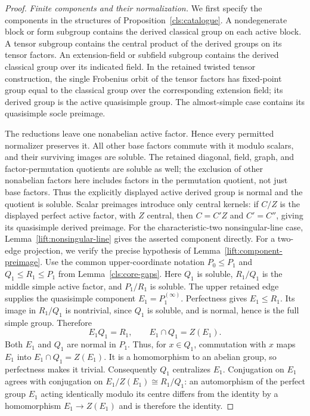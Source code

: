 \begin{proof}
\emph{Finite components and their normalization.}
We first specify the components in the structures of
Proposition~\ref{cls:catalogue}.  A nondegenerate block or form subgroup
contains the derived classical group on each active block.  A tensor
subgroup contains the central product of the derived groups on its
tensor factors.  An extension-field or subfield subgroup contains the
derived classical group over its indicated field.  In the retained
twisted tensor construction, the single Frobenius orbit of the tensor
factors has fixed-point group equal to the classical group over the
corresponding extension field; its derived group is the active
quasisimple group.  The almost-simple case contains its quasisimple
socle preimage.

The reductions leave one nonabelian active factor.  Hence every
permitted normalizer preserves it.  All other base factors commute
with it modulo scalars, and their surviving images are soluble.
The retained diagonal, field, graph, and factor-permutation quotients
are soluble as well; the exclusion of other nonabelian factors here
includes factors in the permutation quotient, not just base factors.
Thus the explicitly displayed active derived group is normal and the
quotient is soluble.  Scalar preimages introduce only central kernels:
if $C/Z$ is the displayed perfect active factor, with $Z$ central,
then $C=C'Z$ and $C'=C''$, giving its quasisimple derived preimage.
For the characteristic-two nonsingular-line case,
Lemma~\ref{lift:nonsingular-line} gives the asserted component directly.
For a two-edge projection, we verify the precise hypothesis of
Lemma~\ref{lift:component-preimage}.  Use the common upper-coordinate
notation $P_0\leq P_1$ and $Q_1\leq R_1\leq P_1$ from
Lemma~\ref{cls:core-gaps}.  Here $Q_1$ is soluble, $R_1/Q_1$ is the
middle simple active factor, and $P_1/R_1$ is soluble.  The upper
retained edge supplies the quasisimple component
$E_1=P_1^{(\infty)}$.  Perfectness gives $E_1\leq R_1$.
Its image in $R_1/Q_1$ is nontrivial, since $Q_1$ is soluble, and is
normal, hence is the full simple group.  Therefore
\[
 E_1Q_1=R_1,\qquad E_1\cap Q_1=Z(E_1).
\]
Both $E_1$ and $Q_1$ are normal in $P_1$.  Thus, for $x\in Q_1$,
commutation with $x$ maps $E_1$ into $E_1\cap Q_1=Z(E_1)$.
It is a homomorphism to an abelian group, so perfectness makes it
trivial.  Consequently $Q_1$ centralizes $E_1$.  Conjugation on
$E_1$ agrees with conjugation on
$E_1/Z(E_1)\cong R_1/Q_1$: an automorphism of the perfect group
$E_1$ acting identically modulo its centre differs from the identity
by a homomorphism $E_1\to Z(E_1)$ and is therefore the identity.


\end{proof}
